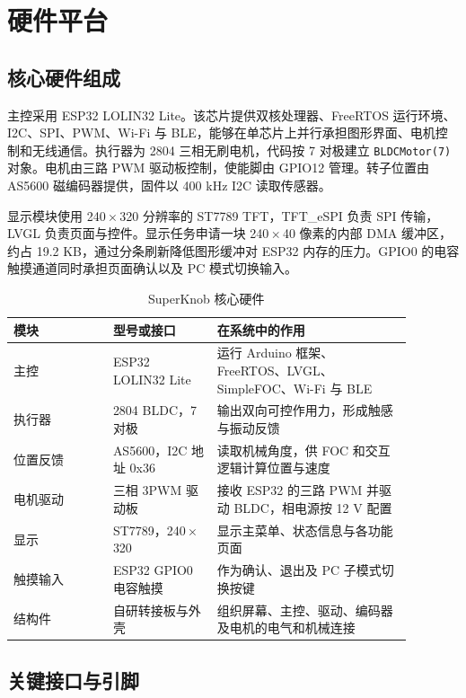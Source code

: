 \section{硬件平台}

\subsection{核心硬件组成}

主控采用 ESP32 LOLIN32 Lite。该芯片提供双核处理器、FreeRTOS 运行环境、I2C、SPI、PWM、Wi-Fi 与 BLE，能够在单芯片上并行承担图形界面、电机控制和无线通信。执行器为 2804 三相无刷电机，代码按 7 对极建立 \texttt{BLDCMotor(7)} 对象。电机由三路 PWM 驱动板控制，使能脚由 GPIO12 管理。转子位置由 AS5600 磁编码器提供，固件以 400 kHz I2C 读取传感器。

显示模块使用 240\,$\times$\,320 分辨率的 ST7789 TFT，TFT\_eSPI 负责 SPI 传输，LVGL 负责页面与控件。显示任务申请一块 240\,$\times$\,40 像素的内部 DMA 缓冲区，约占 19.2 KB，通过分条刷新降低图形缓冲对 ESP32 内存的压力。GPIO0 的电容触摸通道同时承担页面确认以及 PC 模式切换输入。

\begin{table}[H]
\centering
\small
\begin{tabular}{p{0.22\linewidth}p{0.23\linewidth}p{0.43\linewidth}}
\toprule
模块 & 型号或接口 & 在系统中的作用 \\
\midrule
主控 & ESP32 LOLIN32 Lite & 运行 Arduino 框架、FreeRTOS、LVGL、SimpleFOC、Wi-Fi 与 BLE \\
执行器 & 2804 BLDC，7 对极 & 输出双向可控作用力，形成触感与振动反馈 \\
位置反馈 & AS5600，I2C 地址 0x36 & 读取机械角度，供 FOC 和交互逻辑计算位置与速度 \\
电机驱动 & 三相 3PWM 驱动板 & 接收 ESP32 的三路 PWM 并驱动 BLDC，相电源按 12 V 配置 \\
显示 & ST7789，240\,$\times$\,320 & 显示主菜单、状态信息与各功能页面 \\
触摸输入 & ESP32 GPIO0 电容触摸 & 作为确认、退出及 PC 子模式切换按键 \\
结构件 & 自研转接板与外壳 & 组织屏幕、主控、驱动、编码器及电机的电气和机械连接 \\
\bottomrule
\end{tabular}
\caption{SuperKnob 核心硬件}
\label{tab:hardware}
\end{table}

\subsection{关键接口与引脚}

